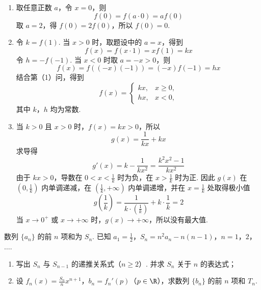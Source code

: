 \begin{solution}
\begin{enumerate}
\item 取任意正数 \(a\)，令 \(x=0\)，则
\[
f(0)=f(a\cdot0)=af(0)
\]
取 \(a=2\)，得 \(f(0)=2f(0)\)，所以 \(f(0)=0\).

\item 令 \(k=f(1)\). 当 \(x>0\) 时，取题设中的 \(a=x\)，得到
\[
f(x)=f(x\cdot1)=xf(1)=kx
\]
令 \(h=-f(-1)\). 当 \(x<0\) 时取 \(a=-x>0\)，则
\[
f(x)=f((-x)(-1))=(-x)f(-1)=hx
\]
结合第（1）问，得到
\[
f(x)=\begin{cases}
kx,&x\geqslant0,\\
hx,&x<0,
\end{cases}
\]
其中 \(k\)，\(h\) 均为常数.

\item 当 \(k>0\) 且 \(x>0\) 时，\(f(x)=kx>0\)，所以
\[
g(x)=\frac{1}{kx}+kx
\]
求导得
\[
g'(x)=k-\frac{1}{kx^2}=\frac{k^2x^2-1}{kx^2}
\]
由于 \(kx>0\)，导数在 \(0<x<\frac{1}{k}\) 时为负，在 \(x>\frac{1}{k}\) 时为正. 因此 \(g(x)\) 在 \((0,\frac{1}{k})\) 内单调递减，在 \((\frac{1}{k},+\infty)\) 内单调递增，并在 \(x=\frac{1}{k}\) 处取得极小值
\[
g\left(\frac1k\right)=\frac{1}{k\cdot(\frac{1}{k})}+k\cdot\frac1k=2
\]
当 \(x\to0^+\) 或 \(x\to+\infty\) 时，\(g(x)\to+\infty\)，所以没有最大值.
\end{enumerate}
\end{solution}

\begin{problem}
数列 \(\{a_{n}\}\) 的前 \(n\) 项和为 \(S_{n}\). 已知 \(a_{1} = \frac{1}{2}\)，\(S_{n} = n^{2}a_{n} - n(n - 1)\)，\(n = 1\)，\(2\)，\(\dots\).

\begin{enumerate}
\item 写出 \(S_{n}\) 与 \(S_{n-1}\) 的递推关系式（\(n \geqslant 2\)）. 并求 \(S_{n}\) 关于 \(n\) 的表达式；
\item 设 \(f_n(x) = \frac{S_n}{n} x^{n+1}\)，\(b_n = f_n'(p)\)（\(p \in \R\)），求数列 \(\{b_n\}\) 的前 \(n\) 项和 \(T_n\).
\end{enumerate}
\end{problem}

